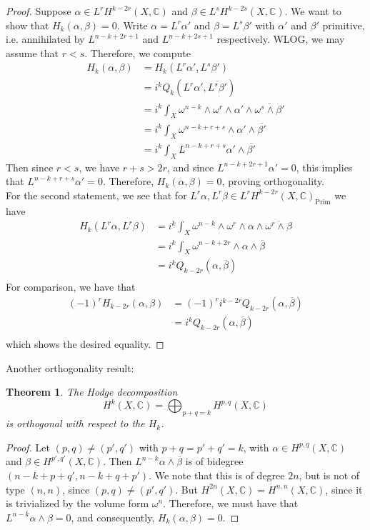 \documentclass[psamsfonts, 12pt]{amsart}
\newtheorem{thm}{Theorem}[section]
\theoremstyle{definition}
\theoremstyle{remark}
\newcommand{\C}{\mathbb{C}}
\begin{document}
\begin{proof}
Suppose $\alpha \in L^rH^{k-2r}(X,\C)$ and $\beta \in L^sH^{k-2s}(X,\C)$. We want to
show that $H_k(\alpha,\beta) = 0$. Write $\alpha = L^r\alpha'$ and $\beta = L^s\beta'$
with $\alpha'$ and $\beta'$ primitive, i.e. annihilated by $L^{n-k+2r+1}$ and
$L^{n-k+2s+1}$ respectively. WLOG, we may assume that $r < s$. Therefore, we compute
\begin{align*}
H_k(\alpha,\beta) &= H_k(L^r\alpha',L^s\beta') \\
&= i^kQ_k(L^r\alpha',\overline{L^s\beta'}) \\
&= i^k\int_X \omega^{n-k}\wedge\omega^r
\wedge\alpha'\wedge\overline{\omega^s\wedge\beta'} \\
&= i^k\int_X \omega^{n-k+r+s} \wedge \alpha'\wedge\overline{\beta'} \\
&= i^k\int_X L^{n-k+r+s}\alpha' \wedge \overline{\beta'}
\end{align*}
Then since $r < s$, we have $r+s > 2r$, and since $L^{n-k+2r+1}\alpha' = 0$, this
implies that $L^{n-k+r+s}\alpha' = 0$. Therefore, $H_k(\alpha,\beta) = 0$, proving
orthogonality. \\

For the second statement, we see that for
$L^r\alpha,L^r\beta \in L^rH^{k-2r}(X,\C)_{\mathrm{Prim}}$ we have
\begin{align*}
H_k(L^r\alpha,L^r\beta) &=
i^k\int_X \omega^{n-k}\wedge\omega^r\wedge\alpha\wedge\overline{\omega^r\wedge\beta} \\
&= i^k\int_X\omega^{n-k+2r}\wedge\alpha\wedge\overline{\beta} \\
&= i^k Q_{k-2r}(\alpha,\overline{\beta}) \\
\end{align*}
For comparison, we have that
\begin{align*}
(-1)^rH_{k-2r}(\alpha,\beta) &= (-1)^ri^{k-2r}Q_{k-2r}(\alpha,\overline{\beta}) \\
&= i^kQ_{k-2r}(\alpha,\overline{\beta})\\
\end{align*}
which shows the desired equality.
\end{proof}
%
Another orthogonality result:
%
\begin{thm}
The Hodge decomposition
\[
H^k(X,\C) = \bigoplus_{p+q=k} H^{p,q}(X,\C)
\]
is orthogonal with respect to the $H_k$.
\end{thm}
%
\begin{proof}
Let $(p,q) \neq (p',q')$ with $p+q = p'+ q' = k$, with $\alpha \in H^{p,q}(X,\C)$
and $\beta \in H^{p',q'}(X,\C)$. Then $L^{n-k}\alpha\wedge\overline{\beta}$
is of bidegree $(n-k+p+q',n-k+q+p')$. We note that this is of degree $2n$, but
is not of type $(n,n)$, since $(p,q) \neq (p',q')$. But $H^{2n}(X,\C) = H^{n,n}(X,\C)$,
since it is trivialized by the volume form $\omega^n$. Therefore, we must have
that $L^{n-k}\alpha\wedge\beta = 0$, and consequently, $H_k(\alpha,\beta) = 0$.
\end{proof}
\end{document}

